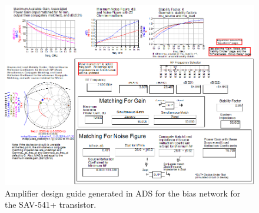 \documentclass[conference]{IEEEtran}
\begin{document}
\begin{figure}[!h]
\centering
\includegraphics[scale=0.35]{pics/designguide.png}
\caption{Amplifier design guide generated in ADS for the bias network for the SAV-541+ transistor.}
\label{fig:designguide}
\end{figure}
\end{document}
